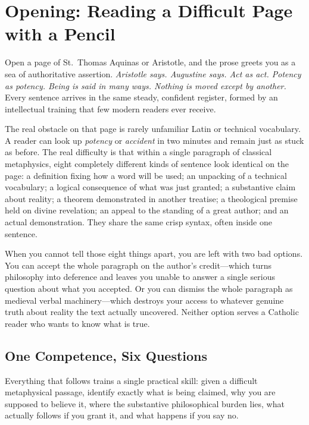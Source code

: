\section*{Opening: Reading a Difficult Page with a Pencil}

Open a page of St.\ Thomas Aquinas or Aristotle, and the prose greets you as a sea of authoritative assertion. \emph{Aristotle says. Augustine says. Act as act. Potency as potency. Being is said in many ways. Nothing is moved except by another.} Every sentence arrives in the same steady, confident register, formed by an intellectual training that few modern readers ever receive.

The real obstacle on that page is rarely unfamiliar Latin or technical vocabulary. A reader can look up \emph{potency} or \emph{accident} in two minutes and remain just as stuck as before. The real difficulty is that within a single paragraph of classical metaphysics, eight completely different kinds of sentence look identical on the page: a definition fixing how a word will be used; an unpacking of a technical vocabulary; a logical consequence of what was just granted; a substantive claim about reality; a theorem demonstrated in another treatise; a theological premise held on divine revelation; an appeal to the standing of a great author; and an actual demonstration. They share the same crisp syntax, often inside one sentence.

When you cannot tell those eight things apart, you are left with two bad options. You can accept the whole paragraph on the author's credit---which turns philosophy into deference and leaves you unable to answer a single serious question about what you accepted. Or you can dismiss the whole paragraph as medieval verbal machinery---which destroys your access to whatever genuine truth about reality the text actually uncovered. Neither option serves a Catholic reader who wants to know what is true.

\subsection*{One Competence, Six Questions}

Everything that follows trains a single practical skill: given a difficult metaphysical passage, identify exactly what is being claimed, why you are supposed to believe it, where the substantive philosophical burden lies, what actually follows if you grant it, and what happens if you say no.

